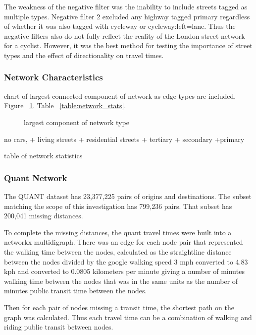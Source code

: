 The weakness of the negative filter was the inability to include streets tagged as multiple types. Negative filter 2 excluded any highway tagged primary regardless of whether it was also tagged with cycleway or cycleway:left=lane. Thus the negative filters also do not fully reflect the reality of the London street network for a cyclist. However, it was the best method for testing the importance of street types and the effect of directionality on travel times. 

\subsubsection{Network Characteristics}

chart of largest connected component of network as edge types are included.  Figure ~\ref{fig:connected_component}. Table ~\ref{table:network_stats}.

\begin{figure}
\centering
\caption{largest component of network type}
\label{fig:connected_component}
\end{figure}

no cars,
+ living streets
+ residential streets
+ tertiary 
+ secondary
+primary

\begin{table}
\centering
\caption{table of network statistics}
\label{table:network_stats}
\end{table}
 
\subsubsection{Quant Network}

The QUANT dataset has 23,377,225 pairs of origins and destinations. The subset matching the scope of this investigation has 799,236 pairs. That subset has 200,041 missing distances. 

To complete the missing distances, the quant travel times were built into a networkx multidigraph. There was an edge for each node pair that represented the walking time between the nodes, calculated as the straightline distance between the nodes divided by the google walking speed 3 mph converted to 4.83 kph and converted to  0.0805 kilometers per minute giving a number of minutes walking time between the nodes that was in the same units as the number of minutes public transit time between the nodes. 

Then for each pair of nodes missing a transit time, the shortest path on the graph was calculated. Thus each travel time can be a combination of walking and riding public transit between nodes. 

